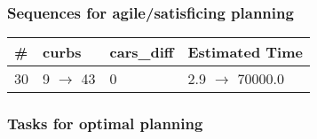 \documentclass{article}
\begin{document}
                         \subsubsection*{Sequences for agile/satisficing planning}

                        \begin{center}
                        \begin{tabular}{@{}l|l|l|l@{}}
                        \# & curbs & cars\_diff & Estimated Time\\\midrule
                        30&9 $\rightarrow$ 43&0&2.9 $\rightarrow$ 70000.0
                        \end{tabular}
                        \end{center}
                    
                                \subsubsection*{Tasks for optimal planning}
                                
\end{document}
